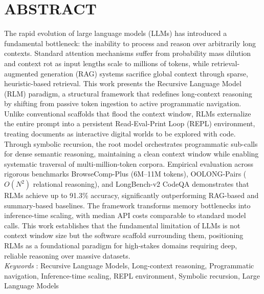 \clearpage
{}
{}
\chapter*{ABSTRACT}
\noindent
\fontsize{12pt}{24pt} \selectfont 
The rapid evolution of large language models (LLMs) has introduced a fundamental bottleneck: the inability to process and reason over arbitrarily long contexts. Standard attention mechanisms suffer from probability mass dilution and context rot as input lengths scale to millions of tokens, while retrieval-augmented generation (RAG) systems sacrifice global context through sparse, heuristic-based retrieval. This work presents the Recursive Language Model (RLM) paradigm, a structural framework that redefines long-context reasoning by shifting from passive token ingestion to active programmatic navigation. Unlike conventional scaffolds that flood the context window, RLMs externalize the entire prompt into a persistent Read-Eval-Print Loop (REPL) environment, treating documents as interactive digital worlds to be explored with code. Through symbolic recursion, the root model orchestrates programmatic sub-calls for dense semantic reasoning, maintaining a clean context window while enabling systematic traversal of multi-million-token corpora. Empirical evaluation across rigorous benchmarks BrowseComp-Plus (6M–11M tokens), OOLONG-Pairs ($O(N^2)$ relational reasoning), and LongBench-v2 CodeQA demonstrates that RLMs achieve up to 91.3\% accuracy, significantly outperforming RAG-based and summary-based baselines. The framework transforms memory bottlenecks into inference-time scaling, with median API costs comparable to standard model calls. This work establishes that the fundamental limitation of LLMs is not context window size but the software scaffold surrounding them, positioning RLMs as a foundational paradigm for high-stakes domains requiring deep, reliable reasoning over massive datasets.\\
\indent
\textit{Keywords} : Recursive Language Models, Long-context reasoning, Programmatic navigation, Inference-time scaling, REPL environment, Symbolic recursion, Large Language Models
\\